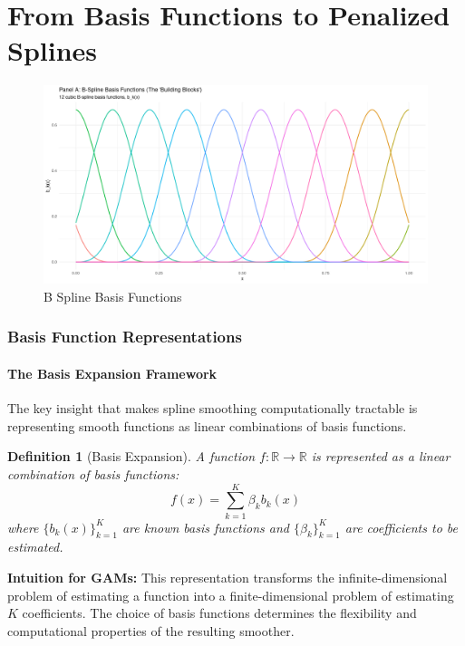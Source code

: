 \documentclass[12pt]{article}
\newtheorem{definition}{Definition}
\newcommand{\R}{\mathbb{R}}
\begin{document}
\part{From Basis Functions to Penalized Splines}
\begin{figure}[h!]
 \centering
 \includegraphics[width=\linewidth]{b-splines.png}
 \caption{B Spline Basis Functions}
 \label{fig:enter-label-1}
\end{figure}
\section{Basis Function Representations}

\subsection{The Basis Expansion Framework}

The key insight that makes spline smoothing computationally tractable is representing smooth functions as linear combinations of basis functions.

\begin{definition}[Basis Expansion]
A function $f: \R \to \R$ is represented as a linear combination of basis functions:
\begin{equation}
f(x) = \sum_{k=1}^{K} \beta_k b_k(x)
\end{equation}
where $\{b_k(x)\}_{k=1}^K$ are known basis functions and $\{\beta_k\}_{k=1}^K$ are coefficients to be estimated.
\end{definition}

\textbf{Intuition for GAMs:} This representation transforms the infinite-dimensional problem of estimating a function into a finite-dimensional problem of estimating $K$ coefficients. The choice of basis functions determines the flexibility and computational properties of the resulting smoother.
\end{document}
